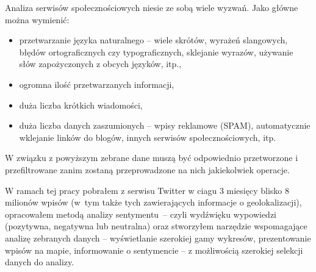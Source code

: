 Analiza serwisów społecznościowych niesie ze sobą wiele wyzwań. Jako główne można wymienić:
\begin{itemize}
  \item przetwarzanie języka naturalnego -- wiele skrótów, wyrażeń slangowych,
błędów ortograficznych czy typograficznych, sklejanie wyrazów, używanie słów
zapożyczonych z obcych języków, itp.,
  \item ogromna ilość przetwarzanych informacji,
  \item duża liczba krótkich wiadomości,
  \item duża liczba danych zaszumionych -- wpisy reklamowe (SPAM), automatycznie 
wklejanie linków do blogów, innych serwisów społecznościowych, itp.
\end{itemize}

W związku z powyższym zebrane dane muszą być odpowiednio przetworzone i przefiltrowane
zanim zostaną przeprowadzone na nich jakiekolwiek operacje.



W ramach tej pracy pobrałem z serwisu Twitter w ciagu 3 miesięcy blisko 8 milionów
wpisów (w~tym także tych zawierających informacje o geolokalizacji), 
opracowałem metodą analizy sentymentu~-- czyli wydźwięku wypowiedzi (pozytywna,
negatywna lub neutralna) oraz stworzyłem narzędzie wspomagające
analizę zebranych danych -- wyświetlanie szerokiej gamy wykresów, prezentowanie
wpisów na mapie, informowanie o sentymencie -- z możliwością szerokiej selekcji danych do analizy.
